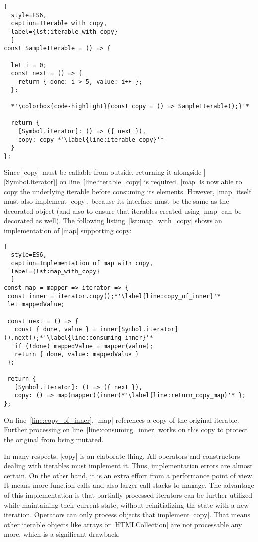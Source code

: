 \begin{lstlisting}[
  style=ES6, 
  caption=Iterable with copy,
  label={lst:iterable_with_copy}
  ]
const SampleIterable = () => {

  let i = 0;
  const next = () => {
    return { done: i > 5, value: i++ };
  };

  *'\colorbox{code-highlight}{const copy = () => SampleIterable();}'*

  return {
    [Symbol.iterator]: () => ({ next }),
    copy: copy *'\label{line:iterable_copy}'*
  }
};
\end{lstlisting}
Since |copy| must be callable from outside, returning it alongside 
|[Symbol.iterator]| on line~\ref{line:iterable_copy} is required. |map| is now
able to copy the underlying  iterable before consuming its elements.
However, |map| itself must also implement |copy|, because its interface must be
the same as the decorated object (and also to ensure that iterables created
using |map| can be decorated as well). The following listing~\ref{lst:map_with_copy} 
shows an implementation of |map| supporting copy:

\begin{lstlisting}[
  style=ES6, 
  caption=Implementation of map with copy,
  label={lst:map_with_copy}
  ]
const map = mapper => iterator => {
 const inner = iterator.copy();*'\label{line:copy_of_inner}'*
 let mappedValue;

 const next = () => {
   const { done, value } = inner[Symbol.iterator]().next();*'\label{line:consuming_inner}'*
   if (!done) mappedValue = mapper(value);
   return { done, value: mappedValue }
 };

 return {
   [Symbol.iterator]: () => ({ next }),
   copy: () => map(mapper)(inner)*'\label{line:return_copy_map}'* };
};
\end{lstlisting}
On line~\ref{line:copy_of_inner}, |map| references a copy of the original
iterable. Further processing on line~\ref{line:consuming_inner} works on this 
copy to protect the original from being mutated.

In many respects, |copy| is an elaborate thing. All operators and constructors 
dealing with iterables must implement it. Thus, implementation errors are 
almost certain. On the other hand, it is an extra effort from a performance point 
of view. It means more function calls and also larger call stacks to manage.
The advantage of this implementation is that partially processed iterators can
be further utilized while maintaining their current state, without
reinitializing the state with a new iteration.
Operators can only process objects that implement |copy|. That means other
iterable objects like arrays or |HTMLCollection| are not processable any more,
which is a significant drawback.

